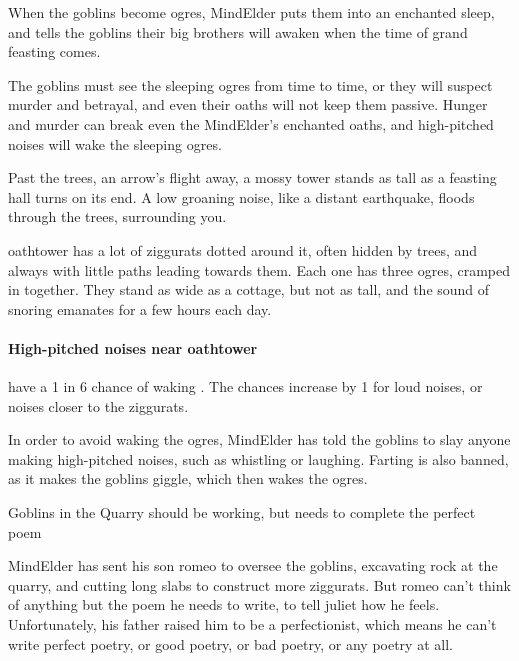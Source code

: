 \begin{multicols}{2}
\begin{exampletext}
  When the goblins become \glspl{ogre}, \gls{MindElder} puts them into an enchanted sleep, and tells the goblins their big brothers will awaken when the time of grand feasting comes.

  The goblins must see the sleeping \glspl{ogre} from time to time, or they will suspect murder and betrayal, and even their oaths will not keep them passive.
  Hunger and murder can break even the \gls{MindElder}'s enchanted oaths, and high-pitched noises will wake the sleeping \glspl{ogre}.
\end{exampletext}

\begin{boxtext}
  Past the trees, an arrow's flight away, a mossy tower stands as tall as a feasting hall turns on its end.
  A low groaning noise, like a distant earthquake, floods through the trees, surrounding you.
\end{boxtext}

\Gls{oathtower} has a lot of ziggurats dotted around it, often hidden by trees, and always with little paths leading towards them.
Each one has three \glspl{ogre}, cramped in together.
They stand as wide as a cottage, but not as tall, and the sound of snoring emanates for a few hours each day.

\paragraph{High-pitched noises near \gls{oathtower}}
have a 1 in 6 chance of waking .
The chances increase by 1 for loud noises, or noises closer to the ziggurats.

In order to avoid waking the \glspl{ogre}, \gls{MindElder} has told the goblins to slay anyone making high-pitched noises, such as whistling or laughing.
Farting is also banned, as it makes the goblins giggle, which then wakes the \glspl{ogre}.

{Goblins in the Quarry}%
{ should be working, but needs to complete the perfect poem}%


\Gls{MindElder} has sent his son \gls{romeo} to oversee the goblins, excavating rock at the quarry, and cutting long slabs to construct more ziggurats.
But \gls{romeo} can't think of anything but the poem he needs to write, to tell \gls{juliet} how he feels.
Unfortunately, his father raised him to be a perfectionist, which means he can't write perfect poetry, or good poetry, or bad poetry, or any poetry at all.


\end{multicols}
